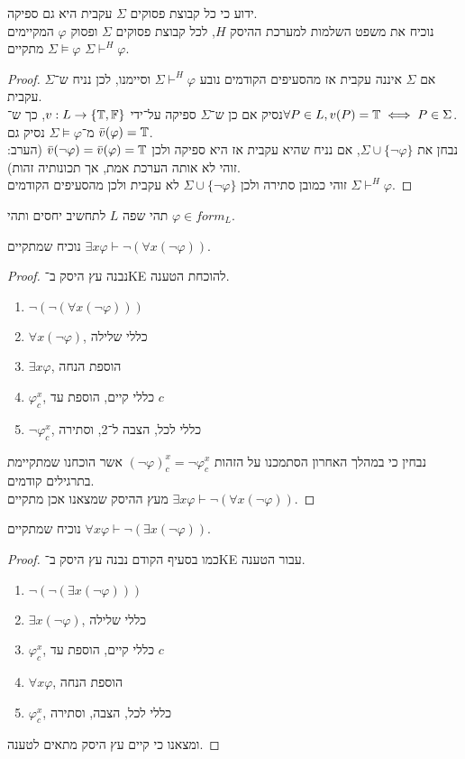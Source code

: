 \subquestion[5]
ידוע כי כל קבוצת פסוקים $\Sigma$ עקבית היא גם ספיקה. \\
נוכיח את משפט השלמות למערכת ההיסק $H$, לכל קבוצת פסוקים $\Sigma$ ופסוק $\varphi$ המקיימים $\Sigma \models \varphi$ מתקיים $\Sigma \vdash^H \varphi$.
\begin{proof}
	אם $\Sigma$ איננה עקבית אז מהסעיפים הקודמים נובע $\Sigma \vdash^H \varphi$ וסיימנו, לכן נניח ש־$\Sigma$ עקבית. \\
	נסיק אם כן ש־$\Sigma$ ספיקה על־ידי $v : L \to \{ \mathbb{T}, \mathbb{F} \}$, כך ש־$\forall P \in L, v(P) = \mathbb{T} \iff P \in \Sigma$. \\
	מ־$\Sigma \models \varphi$ נסיק גם $\bar{v}(\varphi) = \mathbb{T}$. \\
	נבחן את $\Sigma \cup \{ \lnot \varphi \}$, אם נניח שהיא עקבית אז היא ספיקה ולכן $\bar{v}(\lnot \varphi) = \bar{v}(\varphi) = \mathbb{T}$ (הערב: זוהי לא אותה הערכת אמת, אך תכונותיה זהות). \\
	זוהי כמובן סתירה ולכן $\Sigma \cup \{ \lnot \varphi \}$ לא עקבית ולכן מהסעיפים הקודמים $\Sigma \vdash^H \varphi$.
\end{proof}

\question{}
תהי שפה $L$ לתחשיב יחסים ותהי $\varphi \in form_L$.

\subquestion{}
נוכיח שמתקיים $\exists x \varphi \vdash \lnot (\forall x (\lnot \varphi))$.
\begin{proof}
	נבנה עץ היסק ב־KE להוכחת הטענה.
	\begin{enumerate}
		\item $\lnot (\lnot (\forall x (\lnot \varphi)))$
		\item $\forall x (\lnot \varphi)$, כללי שלילה
		\item $\exists x \varphi$, הוספת הנחה
		\item $\varphi^x_c$, כללי קיים, הוספת עד $c$
		\item $\lnot \varphi^x_c$, כללי לכל, הצבה ל־2, וסתירה
	\end{enumerate}
	נבחין כי במהלך האחרון הסתמכנו על הזהות ${(\lnot \varphi)}^x_c = \lnot \varphi^x_c$ אשר הוכחנו שמתקיימת בתרגילים קודמים. \\
	מעץ ההיסק שמצאנו אכן מתקיים $\exists x \varphi \vdash \lnot (\forall x (\lnot \varphi))$.
\end{proof}

\subquestion{}
נוכיח שמתקיים $\forall x \varphi \vdash \lnot (\exists x (\lnot \varphi))$.
\begin{proof}
	כמו בסעיף הקודם נבנה עץ היסק ב־KE עבור הטענה.
	\begin{enumerate}
		\item $\lnot (\lnot (\exists x (\lnot \varphi)))$
		\item $\exists x (\lnot \varphi)$, כללי שלילה
		\item $\varphi_c^x$, כללי קיים, הוספת עד $c$
		\item $\forall x \varphi$, הוספת הנחה
		\item $\varphi_c^x$, כללי לכל, הצבה, וסתירה
	\end{enumerate}
	ומצאנו כי קיים עץ היסק מתאים לטענה.
\end{proof}

